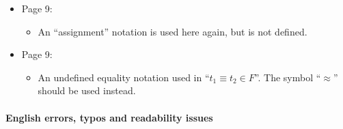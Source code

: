 \begin{itemize}
	\item Page 9:
	\begin{itemize}
		\item An ``assignment'' notation is used here again, but is not defined.
	\end{itemize}

	\item Page 9:
	\begin{itemize}
		\item An undefined equality notation used in ``$t_1 \equiv t_2 \in F$''. The symbol ``$\approx$'' should be used instead.
	\end{itemize}
\end{itemize}


\clearpage
\paragraph{English errors, typos and readability issues}
\mbox{}


